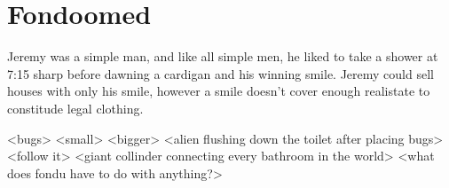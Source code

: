 \documentclass{article}
\begin{document}
\section{Fondoomed}

Jeremy was a simple man, and like all simple men, he liked to take a shower
at 7:15 sharp before dawning a cardigan and his winning smile.  Jeremy could
sell houses with only his smile, however a smile doesn't cover enough
realistate to constitude legal clothing.

<bugs>
<small>
<bigger>
<alien flushing down the toilet after placing bugs>
<follow it>
<giant collinder connecting every bathroom in the world>
<what does fondu have to do with anything?>
\end{document}
